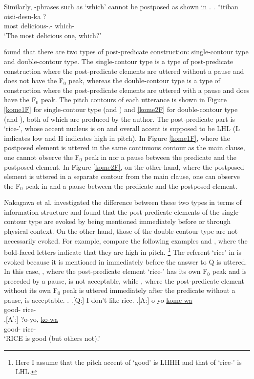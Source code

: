 Similarly,
-phrases such as  `which' cannot be postposed
as shown in \Next.
%
\exg. *itiban oisii-desu-ka ? \\
		most delicious-.- which- \\
		`The most delicious one, which?'


 found that
there are two types of post-predicate construction:
single-contour type and double-contour type.
The single-contour type is a type of post-predicate construction
where the post-predicate elements are uttered without a pause and does not have the F$_{0}$ peak,
whereas the double-contour type is a type of construction
where the post-predicate elements are uttered with a pause and does have the F$_{0}$ peak.
The pitch contours of each utterance is shown in Figure \ref{kome1F} for single-contour type (\Next[A] and \NNext[A]) and \ref{kome2F} for double-contour type (\Next[A$^{\prime}$] and \NNext[A$^{\prime}$]),
both of which are produced by the author.
The post-predicate part is  `rice-',
whose accent nucleus is on  and overall accent is supposed to be LHL (L indicates low and H indicates high in pitch).
In Figure \ref{kome1F}, where the postposed element is uttered in the same continuous contour as the main clause,
one cannot observe the F$_{0}$ peak in  nor a pause between the predicate and the postposed element.
In Figure \ref{kome2F}, on the other hand,
where the postposed element is uttered in a separate contour from the main clause,
one can observe the F$_{0}$ peak in  and a pause between the predicate and the postposed element.

Nakagawa et al. investigated the difference between these two types in terms of information structure and found that
the post-predicate elements of the single-contour type are evoked
by being mentioned immediately before or through physical context.
On the other hand,
those of the double-contour type are not necessarily evoked.
For example, compare the following examples \Next and \NNext,
where the bold-faced letters indicate that
they are high in pitch.%
	\footnote{
	Here I assume that the pitch accent of  `good' is LHHH
	and that of  `rice-' is LHL.
	}
The referent `rice' in \Next is evoked
because it is mentioned in \Next[Q] immediately before the answer to Q is uttered.
In this case,
\Next[A$^{\prime}$],
where the post-predicate element  `rice-' has its own F$_{0}$ peak and is preceded by a pause,
is not acceptable,
while \Next[A],
where the post-predicate element without its own F$_{0}$ peak is uttered immediately after the predicate without a pause,
is acceptable.
%
\ex. 
 \a.[Q:] I don't like rice.
	\bg.[A:] o-yo \ul{kome-wa} \\
			good- rice- \\
	\bg.[A$^{\prime}$:] ?o-yo, \ul{ko-wa} \\
			good- rice- \\
			`RICE is good (but others not).'
			\hfill{\cite[][p.~7]{nakagawaetal08_paper}}

